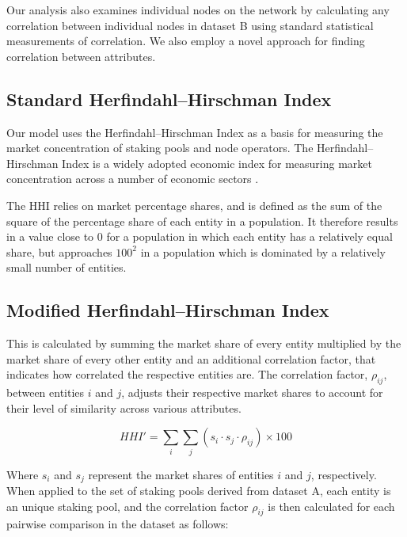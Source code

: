 \documentclass[conference]{IEEEtran}
\begin{document}
Our analysis also examines individual nodes on the network by calculating any correlation between individual nodes in dataset B using standard statistical measurements of correlation.  We also employ a novel approach for finding correlation between attributes.

\subsection{Standard Herfindahl–Hirschman Index}

Our model uses the Herfindahl–Hirschman Index as a basis for measuring the market concentration of staking pools and node operators.  The Herfindahl–Hirschman Index is a widely adopted economic index for measuring market concentration across a number of economic sectors \cite{OECD2021}.

The HHI relies on market percentage shares, and is defined as the sum of the square of the percentage share of each entity in a population.  It therefore results in a value close to 0 for a population in which each entity has a relatively equal share, but approaches $100^2$ in a population which is dominated by a relatively small number of entities.

\subsection{Modified Herfindahl–Hirschman Index}
This is calculated by summing the market share of every entity multiplied by the market share of every other entity and an additional correlation factor, that indicates how correlated the respective entities are.  The correlation factor, $\rho_{ij}$, between entities $i$ and $j$, adjusts their respective market shares to account for their level of similarity across various attributes.

\[
HHI' = \sum_i \sum_j \left(s_i \cdot s_j \cdot \rho_{ij}\right) \times 100
\]

Where $s_i$ and $s_j$ represent the market shares of entities $i$ and $j$, respectively. When applied to the set of staking pools derived from dataset A, each entity is an unique staking pool, and the correlation factor $\rho_{ij}$ is then calculated for each pairwise comparison in the dataset as follows:
\end{document}
